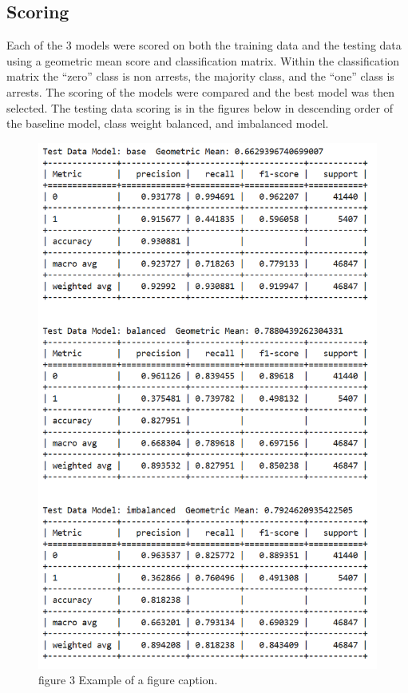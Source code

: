 \documentclass[conference]{IEEEtran}
\begin{document}
\subsection{Scoring}
Each of the 3 models were scored on both the training data and the testing data using a geometric mean score and classification matrix. Within the classification matrix the “zero” class is non arrests, the majority class, and the “one” class is arrests. The scoring of the models were compared and the best model was then selected. The testing data scoring is in the figures below in descending order of the baseline model, class weight balanced, and imbalanced model.
\begin{figure}[htbp]
	\centerline{\includegraphics[width=\linewidth]{Graphs/Table_Graphs.png}}
	\caption{figure 3 Example of a figure caption.}
	\label{Table_Graphs}
\end{figure}
\end{document}
